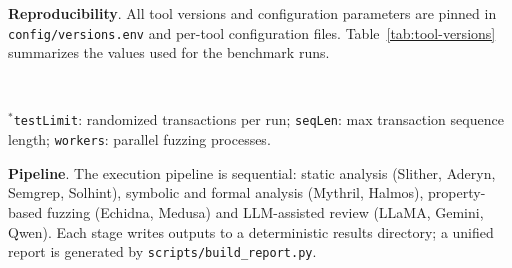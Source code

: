 \textbf{Reproducibility}. All tool versions and configuration parameters are pinned in \texttt{config/versions.env} and per-tool configuration files. Table~\ref{tab:tool-versions} summarizes the values used for the benchmark runs.

\begin{table}[h]
\centering
\caption{Tool versions and key parameters.}
\label{tab:tool-versions}
\\[3pt]
\parbox{\columnwidth}{\scriptsize$^{*}$\texttt{testLimit}: randomized transactions per run; \texttt{seqLen}: max transaction sequence length; \texttt{workers}: parallel fuzzing processes.}
\end{table}

\FloatBarrier

\textbf{Pipeline}. The execution pipeline is sequential: static analysis (Slither, Aderyn, Semgrep, Solhint), symbolic and formal analysis (Mythril, Halmos), property-based fuzzing (Echidna, Medusa) and LLM-assisted review (LLaMA, Gemini, Qwen). Each stage writes outputs to a deterministic results directory; a unified report is generated by \texttt{scripts/build\_report.py}.

